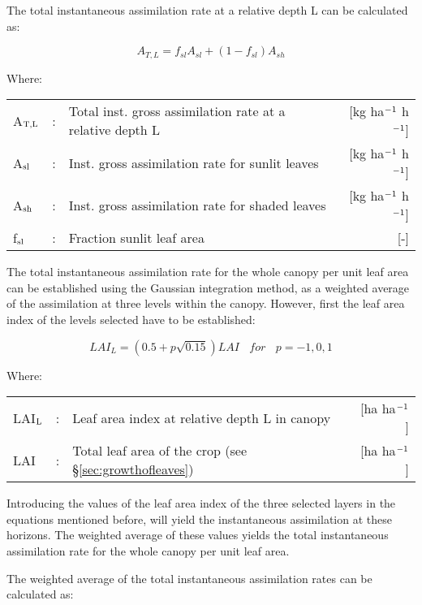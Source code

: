 The total instantaneous assimilation rate at a relative depth L can be calculated as:

\begin{equation}
\label{eq:5.28}
A_{T,L} = f_{sl} A_{sl} + (1 - f_{sl}) A_{sh} 
\end{equation}

Where:\\[5pt]
\begin{tabularx}{\textwidth}{llXr}
	A$_{{\rm T,L}}$ &:& Total inst. gross assimilation rate at a relative depth L   &
	[kg ha$^{{\rm -1}}$ h$^{{\rm -1}}$]\\
	A$_{{\rm sl}}$ &:& Inst. gross assimilation rate for sunlit leaves  & 
	[kg ha$^{{\rm -1}}$ h$^{{\rm -1}}$]\\
	A$_{{\rm sh}}$ &:& Inst. gross assimilation rate for shaded leaves  & 
	[kg ha$^{{\rm -1}}$ h$^{{\rm -1}}$]\\
	f$_{{\rm sl}}$ &:& Fraction sunlit leaf area  &  [-]\\
\end{tabularx}

The total instantaneous assimilation rate for the whole canopy per unit leaf area can be
established using the Gaussian integration method, as a weighted average of the assimilation 
at three levels within the canopy.
However, first the leaf area index of the levels selected have to be established:

\begin{equation}
\label{eq:5.29}
LAI_{L} = (0.5+p \sqrt{0.15})LAI~~~~for~~~~p=-1,0,1
\end{equation}

Where:\\[5pt]
\begin{tabularx}{\textwidth}{llXr}
	LAI$_{{\rm L}}$ &:& Leaf area index at relative depth L in canopy    &    [ha ha$^{{\rm -1}}$]\\
	LAI &:& Total leaf area of the crop (see \S \ref{sec:growthofleaves}) &   [ha ha$^{{\rm -1}}$]\\
\end{tabularx}

Introducing the values of the leaf area index of the three selected layers in the equations
mentioned before, will yield the instantaneous assimilation at these horizons. The
weighted average of these values yields the total instantaneous assimilation rate for the
whole canopy per unit leaf area.

The weighted average of the total instantaneous assimilation rates can be calculated as:

